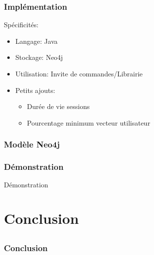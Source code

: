 \documentclass{beamer}
\begin{document}
            \begin{frame}
            \frametitle{Implémentation}
            Spécificités:
            \begin{itemize}
            \pause
            \item Langage: \pause Java
            \pause
            \item Stockage: \pause Neo4j
            \pause
            \item Utilisation: \pause Invite de commandes/Librairie
            \pause
            \item Petits ajouts:
            \pause
            \begin{itemize}
            \item Durée de vie sessions
            \pause
            \item Pourcentage minimum vecteur utilisateur
            \end{itemize}
            \end{itemize}
            \end{frame}
            \begin{frame}
                \frametitle{Modèle Neo4j}
            \end{frame}
            \begin{frame}
                \frametitle{Démonstration}
                \begin{center}
                    Démonstration
                \end{center}
            \end{frame}

    \section{Conclusion}
        \subsection{}
            \begin{frame}
                \frametitle{Conclusion}
            \end{frame}
\end{document}
